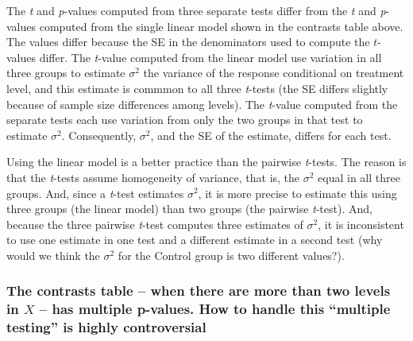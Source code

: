\documentclass[]{book}
\begin{document}
The \emph{t} and \emph{p}-values computed from three separate tests differ from the \emph{t} and \emph{p}-values computed from the single linear model shown in the contrasts table above. The values differ because the SE in the denominators used to compute the \(t\)-values differ. The \emph{t}-value computed from the linear model use variation in all three groups to estimate \(\sigma^2\) the variance of the response conditional on treatment level, and this estimate is commmon to all three \emph{t}-tests (the SE differs slightly because of sample size differences among levels). The \emph{t}-value computed from the separate tests each use variation from only the two groups in that test to estimate \(\sigma^2\). Consequently, \(\sigma^2\), and the SE of the estimate, differs for each test.

Using the linear model is a better practice than the pairwise \emph{t}-tests. The reason is that the \emph{t}-tests assume homogeneity of variance, that is, the \(\sigma^2\) equal in all three groups. And, since a \emph{t}-test estimates \(\sigma^2\), it is more precise to estimate this using three groups (the linear model) than two groups (the pairwise \emph{t}-test). And, because the three pairwise \emph{t}-test computes three estimates of \(\sigma^2\), it is inconsistent to use one estimate in one test and a different estimate in a second test (why would we think the \(\sigma^2\) for the Control group is two different values?).

\hypertarget{the-contrasts-table-when-there-are-more-than-two-levels-in-x-has-multiple-p-values.-how-to-handle-this-multiple-testing-is-highly-controversial}{%
\subsubsection{\texorpdfstring{The contrasts table -- when there are more than two levels in \(X\) -- has multiple p-values. How to handle this ``multiple testing'' is highly controversial}{The contrasts table -- when there are more than two levels in X -- has multiple p-values. How to handle this ``multiple testing'' is highly controversial}}\label{the-contrasts-table-when-there-are-more-than-two-levels-in-x-has-multiple-p-values.-how-to-handle-this-multiple-testing-is-highly-controversial}}
\end{document}
